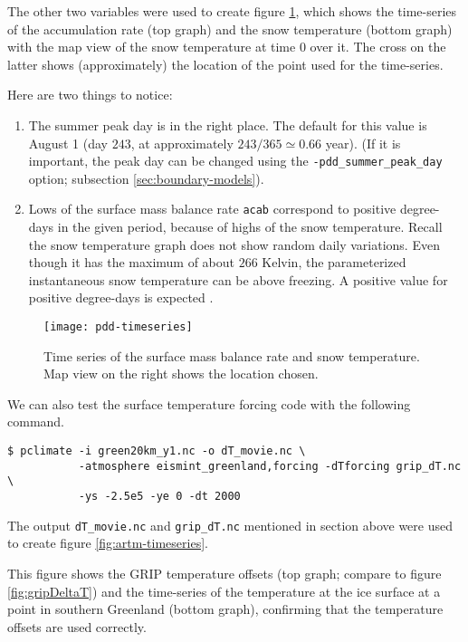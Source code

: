 The other two variables were used to create figure \ref{fig:pddseries}, which
shows the time-series of the accumulation rate (top graph) and the snow
temperature (bottom graph) with the map view of the snow temperature at time 0
over it. The cross on the latter shows (approximately) the location of the
point used for the time-series.

Here are two things to notice:
\begin{enumerate}
\item The summer peak day is in the right place.  The default for this value is
  August 1 (day $243$, at approximately $243/365 \simeq 0.66$ year).  (If it is
  important, the peak day can be changed using the \texttt{-pdd_summer_peak_day}
  option; subsection \ref{sec:boundary-models}).

\item Lows of the surface mass balance rate \texttt{acab} correspond to 
  positive degree-days in the given period, because of highs of the snow 
  temperature.  Recall the snow temperature graph does
  not show random daily variations.  Even though it has the maximum of about $266$
  Kelvin, the parameterized instantaneous snow temperature can be above freezing.
  A positive value for positive degree-days is expected \cite{CalovGreve05}.
\end{enumerate}

\begin{figure}[ht]
  \centering
  \texttt{[image: pdd-timeseries]}
  \caption{Time series of the surface mass balance rate and snow temperature. Map view 
           on the right shows the location chosen.}
  \label{fig:pddseries}
\end{figure}

\bigskip
We can also test the surface temperature forcing code with the following command.
\begin{verbatim}
$ pclimate -i green20km_y1.nc -o dT_movie.nc \
           -atmosphere eismint_greenland,forcing -dTforcing grip_dT.nc \
           -ys -2.5e5 -ye 0 -dt 2000
\end{verbatim}%
The output \texttt{dT_movie.nc} and \texttt{grip_dT.nc} mentioned in section above were used to create figure \ref{fig:artm-timeseries}.

This figure shows the GRIP temperature offsets (top graph; compare to figure \ref{fig:gripDeltaT}) and the time-series of the temperature at the ice surface at a point in southern Greenland (bottom graph), confirming that the temperature offsets are used correctly.

